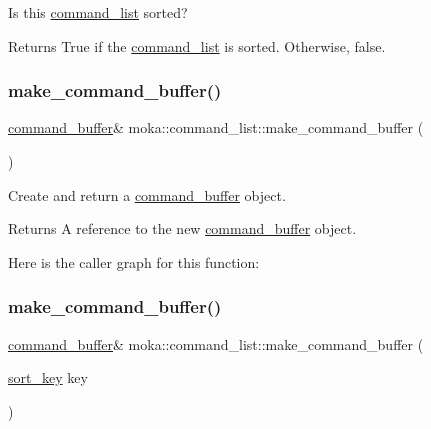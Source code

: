 Is this \mbox{\hyperlink{classmoka_1_1command__list}{command\+\_\+list}} sorted? 

\begin{DoxyReturn}{Returns}
True if the \mbox{\hyperlink{classmoka_1_1command__list}{command\+\_\+list}} is sorted. Otherwise, false. 
\end{DoxyReturn}
\mbox{\label{classmoka_1_1command__list_a9aa451174a49a270c109b99360fa5924}} 
\subsubsection{\texorpdfstring{make\_command\_buffer()}{make\_command\_buffer()}\hspace{0.1cm}{\footnotesize\ttfamily [1/2]}}
{\footnotesize\ttfamily \mbox{\hyperlink{classmoka_1_1command__buffer}{command\+\_\+buffer}}\& moka\+::command\+\_\+list\+::make\+\_\+command\+\_\+buffer (\begin{DoxyParamCaption}{ }\end{DoxyParamCaption})}



Create and return a \mbox{\hyperlink{classmoka_1_1command__buffer}{command\+\_\+buffer}} object. 

\begin{DoxyReturn}{Returns}
A reference to the new \mbox{\hyperlink{classmoka_1_1command__buffer}{command\+\_\+buffer}} object. 
\end{DoxyReturn}
Here is the caller graph for this function\+:
\mbox{\label{classmoka_1_1command__list_a5c2c6daa98bc6586ae09bc8f9c3f5ce2}} 
\subsubsection{\texorpdfstring{make\_command\_buffer()}{make\_command\_buffer()}\hspace{0.1cm}{\footnotesize\ttfamily [2/2]}}
{\footnotesize\ttfamily \mbox{\hyperlink{classmoka_1_1command__buffer}{command\+\_\+buffer}}\& moka\+::command\+\_\+list\+::make\+\_\+command\+\_\+buffer (\begin{DoxyParamCaption}\item[{\mbox{\hyperlink{namespacemoka_afa30a616e67b83113ebdb857555cf2bb}{sort\+\_\+key}}}]{key }\end{DoxyParamCaption})}



